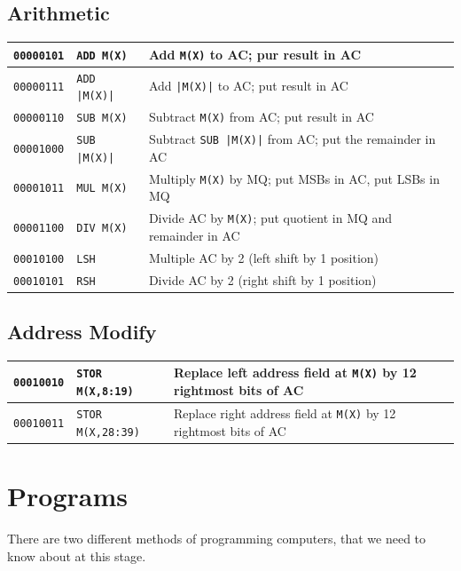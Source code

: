 \subsection{Arithmetic}
\begin{table}[H]
    \begin{tabularx}{\textwidth}{XXX}
        \hline
        \texttt{00000101} & \texttt{ADD M(X)} & Add \texttt{M(X)} to AC; pur result in AC\\
        \hline
        \texttt{00000111} & \texttt{ADD |M(X)|} & Add \texttt{|M(X)|} to AC; put result in AC\\
        \hline
        \texttt{00000110} & \texttt{SUB M(X)} & Subtract \texttt{M(X)} from AC; put result in AC\\
        \hline
        \texttt{00001000} & \texttt{SUB |M(X)|} & Subtract \texttt{SUB |M(X)|} from AC; put the remainder in AC\\
        \hline
        \texttt{00001011} & \texttt{MUL M(X)} & Multiply \texttt{M(X)} by MQ; put MSBs in AC, put LSBs in MQ\\
        \hline
        \texttt{00001100} & \texttt{DIV M(X)} & Divide AC by \texttt{M(X)}; put quotient in MQ and remainder in AC\\
        \hline
        \texttt{00010100} & \texttt{LSH} & Multiple AC by 2 (left shift by 1 position)\\
        \hline
        \texttt{00010101} & \texttt{RSH} & Divide AC by 2 (right shift by 1 position)\\
        \hline
    \end{tabularx}
\end{table}

\subsection{Address Modify}
\begin{table}[H]
    \begin{tabularx}{\textwidth}{XXX}
        \hline
        \texttt{00010010} & \texttt{STOR M(X,8:19)} & Replace left address field at \texttt{M(X)} by 12 rightmost bits of AC\\
        \hline
        \texttt{00010011} & \texttt{STOR M(X,28:39)} & Replace right address field at \texttt{M(X)} by 12 rightmost bits of AC\\
        \hline        
    \end{tabularx}
\end{table}


\section{Programs}
There are two different methods of programming computers, that we need to know about at this stage.
